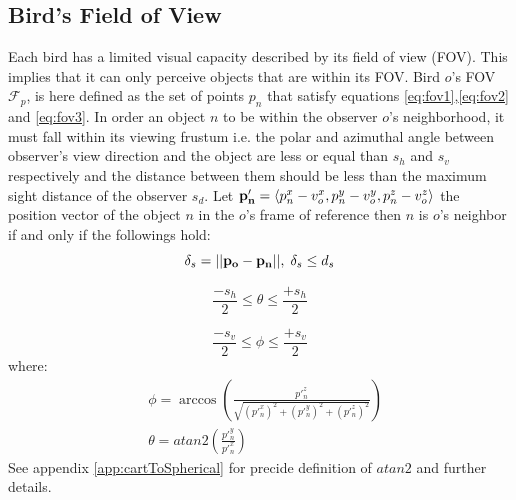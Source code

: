 \subsection{Bird's Field of View}
Each bird has a limited visual capacity described by its field of view (FOV).
This implies that it can only perceive objects that are within its FOV. Bird
$o$'s FOV $\mathcal{F}_p$, is here defined as the set of points $p_n$ that
satisfy equations \ref{eq:fov1},\ref{eq:fov2} and \ref{eq:fov3}. In order an
object  $n$ to be within the  observer $o$'s neighborhood, it must fall within
its viewing frustum i.e. the polar and azimuthal angle between observer's view
direction and the object are less or equal than $s_h$ and $s_v$ respectively
and the distance between them should be less than the maximum sight distance of the
observer $s_d$.
Let $\vb{p'_n}=\expval{p^x_n-v^x_o,p^y_n-v^y_o,p^z_n-v^z_o}$ the position vector of the object $n$ in the $o$'s frame of reference then $n$ is $o$'s neighbor if and only if the followings hold:
\begin{equation}
\label{eq:fov1}
	\delta_s = || \vb{p_o} - \vb{p_n} ||,\; \delta_s \leq d_s 
\end{equation}
 
\begin{equation}
\label{eq:fov2}
	\frac{-s_h}{2} \leq \theta \leq \frac{+s_h}{2}
\end{equation}

\begin{equation}
\label{eq:fov3}
\frac{-s_v}{2} \leq \phi \leq \frac{+s_v}{2}
\end{equation}
where: 
\begin{align*}
 &\phi = \arccos
	\left(\frac{p'^z_n}{\sqrt{(p'^x_n)^2 + (p'^y_n)^2 + (p'^z_n)^2}}\right) \\
	&\theta = atan2 \left(\frac{p'^y_n}{p'^x_n} \right) 
\end{align*}
See appendix \ref{app:cartToSpherical} for precide definition of $atan2$
and further details.
	
	



